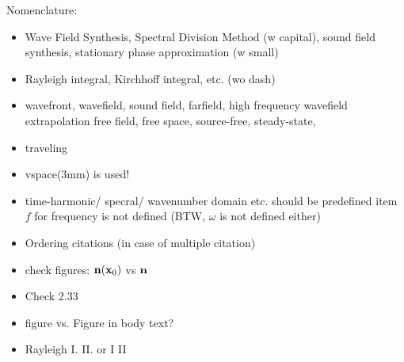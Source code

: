 Nomenclature:
\begin{itemize}
\item Wave Field Synthesis, Spectral Division Method (w capital), sound field synthesis, stationary phase approximation (w small)
\item Rayleigh integral, Kirchhoff integral, etc. (wo dash)
\item 
wavefront,
wavefield,
sound field, 
farfield,
high frequency 
wavefield extrapolation
free field,
free space,
source-free,
steady-state,
\item traveling
\item vspace(3mm) is used!
\item time-harmonic/ specral/ wavenumber domain etc. should be predefined
item $f$ for frequency is not defined (BTW, $\omega$ is not defined either)
\item Ordering citations (in case of multiple citation)
\item check figures: $\mathbf{n}(\mathbf{x}_0)$ vs $\mathbf{n}$
\item Check 2.33
\item figure vs. Figure in body text?
\item Rayleigh I. II. or I II
\end{itemize}